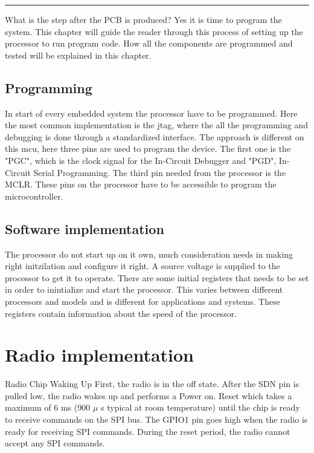 \vspace{-10ex}%
\rule{\textwidth}{0.3pt}
\vspace{10ex}
What is the step after the \gls{PCB} is produced? Yes it is time to program the system. This chapter will guide the reader through this process of setting up the processor to run program code. How all the components are programmed and tested will be explained in this chapter. 


\subsection{Programming} 
In start of every embedded system the processor have to be programmed. Here the most common implementation is the \gls{jtag}, where the all the programming and debugging is done through a standardized interface. The approach is different on this \gls{mcu}, here three pins are used to program the device. The first one is the "PGC", which is the clock signal for the In-Circuit Debugger and "PGD", In-Circuit Serial Programming. The third pin needed from the processor is the MCLR. These pins on the processor have to be accessible to program the microcontroller. 


\subsection{Software implementation}
The processor do not start up on it own, much consideration needs in making right initzilation and configure it right. A source voltage is supplied to the processor to get it to operate. There are some initial registers that needs to be set in order to inintialize and start the processor. This varies between different processors and models and is different for applications and systems. These registers contain information about the speed of the processor.    


\section{Radio implementation} %



Radio Chip Waking Up First,  the  radio  is  in  the  off  state. After  the  SDN  pin  is  pulled  low,  the  radio  wakes  up  and  performs  a  Power  on.
Reset  which  takes  a  maximum  of  6 ms  (900 $\mu$ s  typical  at  room  temperature)  until  the  chip  is  ready  to  receive commands on the SPI bus. The GPIO1 pin goes high when the radio is ready for receiving SPI commands. During the reset period, the radio cannot accept any SPI commands. 
